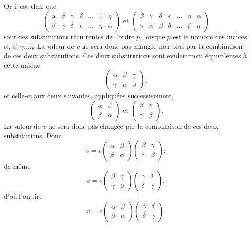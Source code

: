 \documentclass[oneside, 12 pt, leqno]{memoir}
\begin{document}
Or il est clair que
\[ \left(\begin{array}{ccccccc}\alpha & \beta & \gamma & \delta & \dots & \zeta & \eta \\\beta & \gamma & \delta & \epsilon & \dots & \eta & \alpha\end{array}\right) \text{ et } \left(\begin{array}{ccccccc}\beta & \gamma & \delta & \epsilon & \dots & \eta & \alpha\\\gamma & \alpha & \beta & \delta & \dots & \zeta & \eta \end{array}\right) \]
sont des substitutions récurrentes de l'ordre \(p\), lorsque \(p\) est le nombre des indices \(\alpha\), \(\beta\), \(\gamma \dots \eta\). La valeur de \(v\) ne sera donc pas changée non plus par la combinaison de ces deux substitutions. Ces deux substitutions sont évidemment équivalentes à cette unique
\[\left(\begin{array}{ccc} \alpha & \beta & \gamma \\ \gamma & \alpha & \beta\end{array}\right),\]
et celle-ci aux deux suivantes, appliquées successivement,
\[\left(\begin{array}{cc}\alpha & \beta \\\beta & \alpha\end{array}\right) \text { et }\left(\begin{array}{cc}\beta & \gamma \\\gamma & \beta\end{array}\right).\]
La valeur de \(v\) ne sera donc pas changée par la combinaison de ces deux substitutions. Donc
\[v=v\left(\begin{array}{cc}\alpha & \beta \\\beta & \alpha\end{array}\right)\left(\begin{array}{cc}\beta & \gamma \\\gamma & \beta\end{array}\right);\]
de même
\[v=v\left(\begin{array}{cc}\beta & \gamma \\\gamma & \beta\end{array}\right)\left(\begin{array}{cc}\gamma & \delta \\\delta & \gamma \end{array}\right),\]
d'où l'on tire
\[v=v\left(\begin{array}{cc}\alpha & \beta \\\beta & \alpha\end{array}\right)\left(\begin{array}{cc}\gamma & \delta \\\delta & \gamma
\end{array}\right).\]
\end{document}
